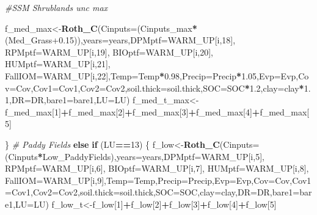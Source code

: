 \documentclass[
  10pt,
  b5paper,
]{book}
\newenvironment{Shaded}{\begin{snugshade}}{\end{snugshade}}
\newcommand{\CommentTok}[1]{\textcolor[rgb]{0.56,0.35,0.01}{\textit{#1}}}
\newcommand{\ControlFlowTok}[1]{\textcolor[rgb]{0.13,0.29,0.53}{\textbf{#1}}}
\newcommand{\DataTypeTok}[1]{\textcolor[rgb]{0.13,0.29,0.53}{#1}}
\newcommand{\DecValTok}[1]{\textcolor[rgb]{0.00,0.00,0.81}{#1}}
\newcommand{\FloatTok}[1]{\textcolor[rgb]{0.00,0.00,0.81}{#1}}
\newcommand{\KeywordTok}[1]{\textcolor[rgb]{0.13,0.29,0.53}{\textbf{#1}}}
\newcommand{\NormalTok}[1]{#1}
\newcommand{\OperatorTok}[1]{\textcolor[rgb]{0.81,0.36,0.00}{\textbf{#1}}}
\begin{document}
\begin{Shaded}
\begin{Highlighting}[]
{\CommentTok{#SSM Shrublands unc max}

\NormalTok{f_med_max<-}\KeywordTok{Roth_C}\NormalTok{(}\DataTypeTok{Cinputs=}\NormalTok{(Cinputs_max}\OperatorTok{*}\NormalTok{(Med_Grass}\FloatTok{+0.15}\NormalTok{)),}\DataTypeTok{years=}\NormalTok{years,}\DataTypeTok{DPMptf=}\NormalTok{WARM_UP[i,}\DecValTok{18}\NormalTok{], }\DataTypeTok{RPMptf=}\NormalTok{WARM_UP[i,}\DecValTok{19}\NormalTok{], }\DataTypeTok{BIOptf=}\NormalTok{WARM_UP[i,}\DecValTok{20}\NormalTok{], }\DataTypeTok{HUMptf=}\NormalTok{WARM_UP[i,}\DecValTok{21}\NormalTok{], }\DataTypeTok{FallIOM=}\NormalTok{WARM_UP[i,}\DecValTok{22}\NormalTok{],}\DataTypeTok{Temp=}\NormalTok{Temp}\OperatorTok{*}\FloatTok{0.98}\NormalTok{,}\DataTypeTok{Precip=}\NormalTok{Precip}\OperatorTok{*}\FloatTok{1.05}\NormalTok{,}\DataTypeTok{Evp=}\NormalTok{Evp,}\DataTypeTok{Cov=}\NormalTok{Cov,}\DataTypeTok{Cov1=}\NormalTok{Cov1,}\DataTypeTok{Cov2=}\NormalTok{Cov2,}\DataTypeTok{soil.thick=}\NormalTok{soil.thick,}\DataTypeTok{SOC=}\NormalTok{SOC}\OperatorTok{*}\FloatTok{1.2}\NormalTok{,}\DataTypeTok{clay=}\NormalTok{clay}\OperatorTok{*}\FloatTok{1.1}\NormalTok{,}\DataTypeTok{DR=}\NormalTok{DR,}\DataTypeTok{bare1=}\NormalTok{bare1,}\DataTypeTok{LU=}\NormalTok{LU)}
\NormalTok{f_med_t_max<-f_med_max[}\DecValTok{1}\NormalTok{]}\OperatorTok{+}\NormalTok{f_med_max[}\DecValTok{2}\NormalTok{]}\OperatorTok{+}\NormalTok{f_med_max[}\DecValTok{3}\NormalTok{]}\OperatorTok{+}\NormalTok{f_med_max[}\DecValTok{4}\NormalTok{]}\OperatorTok{+}\NormalTok{f_med_max[}\DecValTok{5}\NormalTok{]}

\NormalTok{\}}
\CommentTok{# Paddy Fields }
\ControlFlowTok{else} \ControlFlowTok{if}\NormalTok{ (LU}\OperatorTok{==}\DecValTok{13}\NormalTok{) \{}
\NormalTok{f_low<-}\KeywordTok{Roth_C}\NormalTok{(}\DataTypeTok{Cinputs=}\NormalTok{(Cinputs}\OperatorTok{*}\NormalTok{Low_PaddyFields),}\DataTypeTok{years=}\NormalTok{years,}\DataTypeTok{DPMptf=}\NormalTok{WARM_UP[i,}\DecValTok{5}\NormalTok{], }\DataTypeTok{RPMptf=}\NormalTok{WARM_UP[i,}\DecValTok{6}\NormalTok{], }\DataTypeTok{BIOptf=}\NormalTok{WARM_UP[i,}\DecValTok{7}\NormalTok{], }\DataTypeTok{HUMptf=}\NormalTok{WARM_UP[i,}\DecValTok{8}\NormalTok{], }\DataTypeTok{FallIOM=}\NormalTok{WARM_UP[i,}\DecValTok{9}\NormalTok{],}\DataTypeTok{Temp=}\NormalTok{Temp,}\DataTypeTok{Precip=}\NormalTok{Precip,}\DataTypeTok{Evp=}\NormalTok{Evp,}\DataTypeTok{Cov=}\NormalTok{Cov,}\DataTypeTok{Cov1=}\NormalTok{Cov1,}\DataTypeTok{Cov2=}\NormalTok{Cov2,}\DataTypeTok{soil.thick=}\NormalTok{soil.thick,}\DataTypeTok{SOC=}\NormalTok{SOC,}\DataTypeTok{clay=}\NormalTok{clay,}\DataTypeTok{DR=}\NormalTok{DR,}\DataTypeTok{bare1=}\NormalTok{bare1,}\DataTypeTok{LU=}\NormalTok{LU)}
\NormalTok{f_low_t<-f_low[}\DecValTok{1}\NormalTok{]}\OperatorTok{+}\NormalTok{f_low[}\DecValTok{2}\NormalTok{]}\OperatorTok{+}\NormalTok{f_low[}\DecValTok{3}\NormalTok{]}\OperatorTok{+}\NormalTok{f_low[}\DecValTok{4}\NormalTok{]}\OperatorTok{+}\NormalTok{f_low[}\DecValTok{5}\NormalTok{]}

}
\end{Highlighting}
\end{Shaded}
\end{document}
